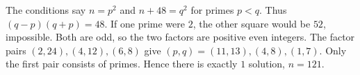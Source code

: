 The conditions say $n=p^2$ and $n+48=q^2$ for primes $p<q$. Thus $(q-p)(q+p)=48$. If one prime were $2$, the other square would be $52$, impossible. Both are odd, so the two factors are positive even integers. The factor pairs $(2,24),(4,12),(6,8)$ give $(p,q)=(11,13),(4,8),(1,7)$. Only the first pair consists of primes. Hence there is exactly $\boxed1$ solution, $n=121$.
